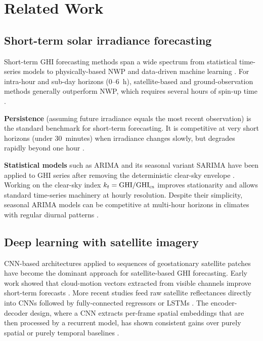 \section{Related Work}
\label{sec:related}

\subsection{Short-term solar irradiance forecasting}

Short-term GHI forecasting methods span a wide spectrum from statistical time-series
models to physically-based NWP and data-driven machine learning
\cite{diagne2013,voyant2017}. For intra-hour and sub-day horizons (0--6~h),
satellite-based and ground-observation methods generally outperform NWP, which
requires several hours of spin-up time \cite{perez2013}.

\textbf{Persistence} (assuming future irradiance equals the most recent observation)
is the standard benchmark for short-term forecasting. It is competitive at very
short horizons (under 30~minutes) when irradiance changes slowly, but degrades
rapidly beyond one hour \cite{lonij2013}.

\textbf{Statistical models} such as ARIMA and its seasonal variant SARIMA have
been applied to GHI series after removing the deterministic clear-sky envelope
\cite{reikard2009,bacher2009}. Working on the clear-sky index $k_t = \text{GHI}/\text{GHI}_\text{cs}$
improves stationarity and allows standard time-series machinery at hourly resolution.
Despite their simplicity, seasonal ARIMA models can be competitive at multi-hour
horizons in climates with regular diurnal patterns \cite{pedro2012}.

\subsection{Deep learning with satellite imagery}

CNN-based architectures applied to sequences of geostationary satellite patches
have become the dominant approach for satellite-based GHI forecasting. Early
work showed that cloud-motion vectors extracted from visible channels improve
short-term forecasts \cite{chow2011}. More recent studies feed raw satellite
reflectances directly into CNNs followed by fully-connected regressors or LSTMs
\cite{huertas2018,paletta2021,feng2022}. The encoder-decoder design, where a CNN
extracts per-frame spatial embeddings that are then processed by a recurrent model,
has shown consistent gains over purely spatial or purely temporal baselines
\cite{wang2019}.

